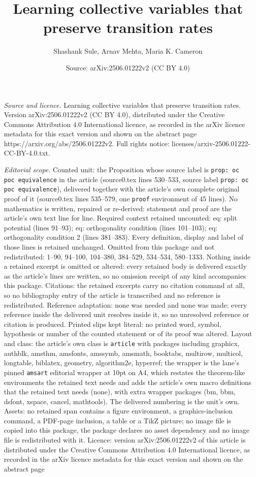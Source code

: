 \documentclass[10pt,a4paper]{amsart}
\title[Learning collective variables that preserve transition rates]{Learning collective variables that preserve transition rates}
\author{Shashank Sule, Arnav Mehta, Maria K. Cameron}
\date{Source: arXiv:2506.01222v2 (CC BY 4.0)}
\begin{document}
\maketitle

\noindent\emph{Source and licence.} Learning collective variables that preserve transition rates. Version arXiv:2506.01222v2 (CC BY 4.0), distributed under the Creative Commons Attribution 4.0 International licence, as recorded in the arXiv licence metadata for this exact version and shown on the abstract page https://arxiv.org/abs/2506.01222v2. Full rights notice: licenses/arxiv-2506.01222-CC-BY-4.0.txt.\par\smallskip

\noindent\textit{Editorial scope.} Counted unit: the Proposition whose source label is \texttt{prop: oc poc equivalence} in the article (source0.tex lines 530--533, source label \texttt{prop: oc poc equivalence}), delivered together with the article's own complete original proof of it (source0.tex lines 535--579, one \texttt{proof} environment of 45 lines). No mathematics is written, repaired or re-derived: statement and proof are the article's own text line for line. Required context retained uncounted: eq: split potential (lines 91--93); eq: orthogonality condition (lines 101--103); eq: orthogonality condition 2 (lines 381--383). Every definition, display and label of those lines is retained unchanged. Omitted from this package and not redistributed: 1--90, 94--100, 104--380, 384--529, 534--534, 580--1333. Nothing inside a retained excerpt is omitted or altered: every retained body is delivered exactly as the article's lines are written, so no omission receipt of any kind accompanies this package. Citations: the retained excerpts carry no citation command at all, so no bibliography entry of the article is transcribed and no reference is redistributed. Reference adaptation: none was needed and none was made; every reference inside the delivered unit resolves inside it, so no unresolved reference or citation is produced. Printed slips kept literal: no printed word, symbol, hypothesis or number of the counted statement or of its proof was altered. Layout and class: the article's own class is \texttt{article} with packages including graphicx, authblk, amsthm, amsfonts, amssymb, amsmath, booktabs, multirow, multicol, longtable, biblatex, geometry, algorithm2e, hyperref; the wrapper is the lane's pinned \texttt{amsart} editorial wrapper at 10pt on A4, which restates the theorem-like environments the retained text needs and adds the article's own macro definitions that the retained text needs (none), with extra wrapper packages (bm, bbm, dsfont, xspace, cancel, mathtools). The delivered numbering is the unit's own. Assets: no retained span contains a figure environment, a graphics-inclusion command, a PDF-page inclusion, a table or a TikZ picture; no image file is copied into this package, the package declares no asset dependency and no image file is redistributed with it. Licence: version arXiv:2506.01222v2 of this article is distributed under the Creative Commons Attribution 4.0 International licence, as recorded in the arXiv licence metadata for this exact version and shown on the abstract page 
\end{document}
